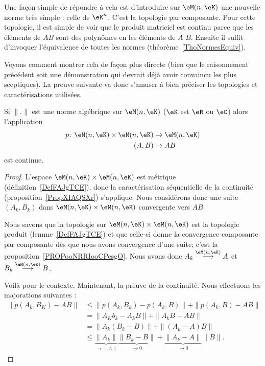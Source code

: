 Une façon simple de répondre à cela est d'introduire sur \( \eM(n,\eK)\) une nouvelle norme très simple : celle de \( \eK^n\). C'est la topologie par composante. Pour cette topologie, il est simple de voir que le produit matriciel est continu parce que les éléments de \( AB\) sont des polynômes en les éléments de \( A\) \( B\). Ensuite il suffit d'invoquer l'équivalence de toutes les normes (théorème~\ref{ThoNormesEquiv}).

Voyons comment montrer cela de façon plus directe (bien que le raisonnement précédent soit une démonstration qui devrait déjà avoir convaincu les plus sceptiques). La preuve suivante va donc s'amuser à bien préciser les topologies et caractérisations utilisées.

\begin{lemma}
    Si \( \| . \|\) est une norme algébrique sur \( \eM(n,\eK)\) (\( \eK\) est \( \eR\) ou \( \eC\)) alors l'application
    \begin{equation}
        \begin{aligned}
            p\colon \eM(n,\eK)\times \eM(n,\eK)&\to \eM(n,\eK) \\
            (A,B)&\mapsto AB
        \end{aligned}
    \end{equation}
    est continue.
\end{lemma}

\begin{proof}
    L'espace \( \eM(n,\eK)\times \eM(n,\eK)\) est métrique (définition~\ref{DefFAJgTCE}), donc la caractérisation séquentielle de la continuité (proposition~\ref{PropXIAQSXr}) s'applique. Nous considérons donc une suite \( (A_k,B_k)\) dans \( \eM(n,\eK)\times \eM(n,\eK)\) convergente vers \( AB\).

    Nous savons que la topologie sur \( \eM(n,\eK)\times \eM(n,\eK)\) est la topologie produit (lemme~\ref{DefFAJgTCE}) et que celle-ci donne la convergence composante par composante dès que nous avons convergence d'une suite; c'est la proposition~\ref{PROPooNRRIooCPesgO}. Nous avons donc \( A_k\stackrel{\eM(n,\eK)}{\longrightarrow}A\) et \( B_k\stackrel{\eM(n,\eK)}{\longrightarrow}B\).

    Voilà pour le contexte. Maintenant, la preuve de la continuité. Nous effectuons les majorations suivantes :
    \begin{subequations}
        \begin{align}
            \| p(A_k,B_K)-AB \|&\leq \| p(A_k,B_k)-p(A_k,B) \|+\| p(A_k,B)-AB \|\\
            &=\| A_Kb_k-A_kB \|+\| A_kB-AB \|\\
            &=\| A_k(B_k-B) \|+\| (A_k-A)B \|\\
            &\leq \underbrace{\| A_k \|}_{\to \| A \|}\underbrace{\| B_k-B \|}_{\to 0}+\underbrace{\| A_k-A \|}_{\to 0}\| B \|.
        \end{align}
    \end{subequations}
\end{proof}
